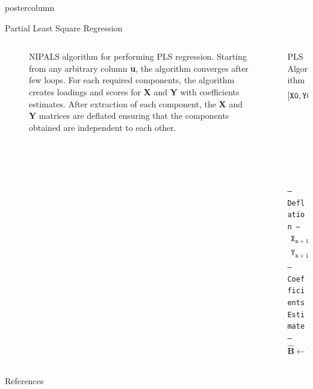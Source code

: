 \documentclass[9pt, final]{beamer}\usepackage[]{graphicx}\usepackage[]{color}
\begin{document}
\begin{frame}[fragile]
\begin{columns}
\begin{column}{.49\textwidth}
\begin{beamercolorbox}[center, wd=\textwidth]{postercolumn}
\begin{minipage}[T]{.98\textwidth}
{\begin{block}{Partial Least Square Regression}
\begin{columns}[b]
\begin{column}{0.45\textwidth}
\begin{figure}
                  \caption{NIPALS algorithm for performing PLS regression. Starting from any arbitrary column \textbf{u}, the algorithm converges after few loops. For each required components, the algorithm creates loadings and scores for \textbf{X} and \textbf{Y} with coefficients estimates. After extraction of each component, the \textbf{X} and \textbf{Y} matrices are deflated ensuring that the components obtained are independent to each other.}
                  \label{fig:pls}
                \end{figure}
	           \end{column} 
              \begin{column}{0.45\textwidth}
              		\begin{exampleblock}{PLS Algorithm}
           			\begin{align*}
           				\mathtt{[X0, Y0]} & \leftarrow \mathtt{scale(X, Y)} \\
           				\mathtt{w} & \leftarrow \texttt{Obtained from}\\
           				& \texttt{\; \; \;NIPALS algorithm} \\
           				\mathtt{w} & \leftarrow \mathtt{w/|w|} \\
           				\mathtt{t} & \leftarrow \mathtt{X_0w} \\
           				\mathtt{p} & \leftarrow \mathtt{X_a^tt(t't)^{-1}}\\
           				\mathtt{q} & \leftarrow \mathtt{Y_a^tt(t't)^{-1}}
              	\end{align*}	
              		\texttt{--- Deflation ---}
              	\begin{align*}
              		\mathtt{X_{a+1}} & \leftarrow \mathtt{X_a - tp^t} \\
             			\mathtt{Y_{a+1}} & \leftarrow \mathtt{Y_a - tq^t} 
	             	\end{align*}	
           			\texttt{---  Coefficients Estimate ---}
             		\[\mathtt{\hat{\mathbf{B}}} \leftarrow \mathtt{\mathbf{W(P^tW)^{-1}Q}}\]
              		\end{exampleblock}
         \end{column}%
            \end{columns} %
            \end{block}
            \begin{block}{References}
            \nocite{Martens:2005aa, wold2001pls,saebo2010three, saebo2015Academia}
            {\printbibliography}
            \end{block}
            
}
\end{minipage}
\end{beamercolorbox}
\end{column}
\end{columns}
\end{frame}
\end{document}
